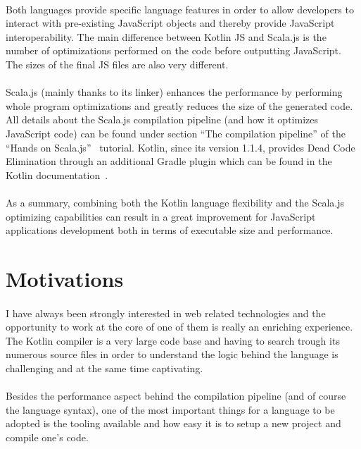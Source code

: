 \paragraph{} Both languages provide specific language features in order to allow developers to interact with 
pre-existing JavaScript objects and thereby provide JavaScript interoperability. The main 
difference between Kotlin JS and Scala.js is the number of optimizations performed on the code before 
outputting JavaScript. The sizes of the final JS files are also very different. 

\paragraph{} Scala.js (mainly thanks to its linker) enhances the performance by performing whole 
program optimizations and greatly reduces the size of the generated code. All details about the 
Scala.js compilation pipeline (and how it optimizes JavaScript code) can be found under section 
\enquote{The compilation pipeline} of the \enquote{Hands on Scala.js}~\cite{scalajs_handson} 
tutorial. Kotlin, since its version 1.1.4, provides Dead Code Elimination through an additional 
Gradle plugin which can be found in the Kotlin documentation~\cite{kotlin_dce}.


\paragraph{} As a summary, combining both the Kotlin language flexibility and the Scala.js 
optimizing capabilities can result in a great improvement for JavaScript applications development 
both in terms of executable size and performance.

\section{Motivations}
\paragraph{} I have always been strongly interested in web related technologies and the 
opportunity to work at the core of one of them is really an enriching experience. The Kotlin 
compiler is a very large code base and having to search trough its numerous source files in order 
to understand the logic behind the language is challenging and at the same time captivating.

\paragraph{} Besides the performance aspect behind the compilation pipeline (and of course the 
language syntax), one of the most important things for a language to be adopted is the tooling 
available and how easy it is to setup a new project and compile one's code.
    
